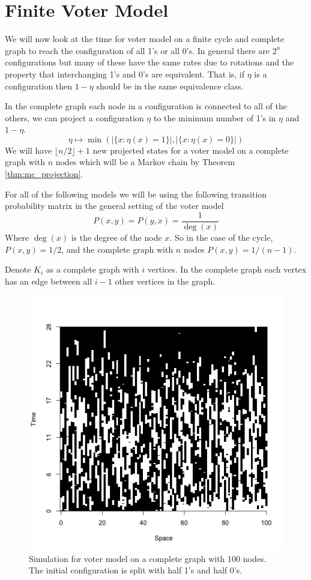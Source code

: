 \section{Finite Voter Model}
We will now look at the time for voter model on a finite cycle and complete graph to reach the configuration of all 1's or all 0's.
In general there are $2^n$ configurations but many of these have the same rates due to rotations and the property that interchanging 1's and 0's are equivalent.
That is, if $\eta$ is a configuration then $1 - \eta$ should be in the same equivalence class.

In the complete graph each node in a configuration is connected to all of the others, we can project a configuration $\eta$ to the minimum number of 1's in $\eta$ and $1 - \eta$.
$$
\eta \mapsto \min\left(|\{x : \eta(x) = 1\}|, |\{x : \eta(x) = 0\}|  \right)
$$
We will have $\lfloor n/2 \rfloor + 1$ new projected states for a voter model on a complete graph with $n$ nodes which will be a Markov chain
by Theorem \ref{thm:mc_projection}.

For all of the following models we will be using the following transition probability matrix in the general setting of the voter model
$$
P(x,y) = P(y,x) = \frac{1}{\deg(x)}
$$
Where $\deg(x)$ is the degree of the node $x$.
So in the case of the cycle, $P(x,y) = 1/2$, and the complete graph with $n$ nodes $P(x,y) = 1/(n - 1)$.

Denote $K_i$ as a complete graph with $i$ vertices.
In the complete graph each vertex has an edge between all $i - 1$ other vertices in the graph.

\begin{figure}[H]
  \centering
    \includegraphics[width=.80\textwidth]{figures/voter_simulation_1d_complete_split_100.png}
   \caption{Simulation for voter model on a complete graph with 100 nodes. The initial configuration is split with half 1's and half 0's.}
  \label{fig:voter_sim_1d_complete.png}
\end{figure}

